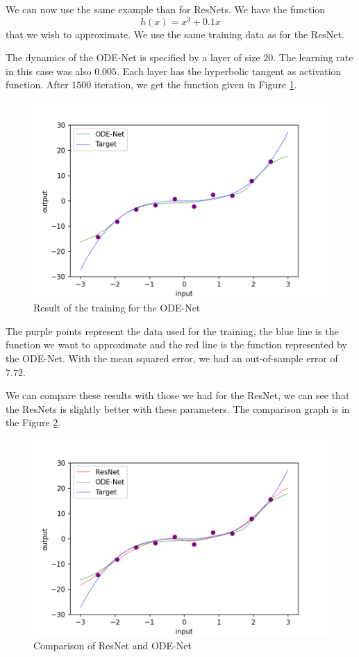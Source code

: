 \documentclass[10pt,a4paper]{article}
\theoremstyle{definition}
\theoremstyle{definition}
\theoremstyle{definition}
\begin{document}
We can now use the same example than for ResNets. We have the function 
$$
h(x) = x^3 + 0.1x
$$
that we wish to approximate. We use the same training data as for the ResNet.

The dynamics of the ODE-Net is specified by a layer of size $20$. The learning rate in this case was also $0.005$. Each layer has the hyperbolic tangent as activation function. After $1500$ iteration, we get the function given in Figure \ref{example_odenet}.

\begin{figure}[!h]
\center
\includegraphics[scale=0.5]{ex_odenet_final.png}
\caption{Result of the training for the ODE-Net}
\label{example_odenet}
\end{figure}

The purple points represent the data used for the training, the blue line is the function we want to approximate and the red line is the function represented by the ODE-Net. With the mean squared error, we had an out-of-sample error of $7.72$.

We can compare these results with those we had for the ResNet, we can see that the ResNets is slightly better with these parameters. The comparison graph is in the Figure \ref{comparaison}.
\begin{figure}[!h]
\center
\includegraphics[scale=0.5]{comparaison_final.png}
\caption{Comparison of ResNet and ODE-Net}
\label{comparaison}
\end{figure}
\end{document}
